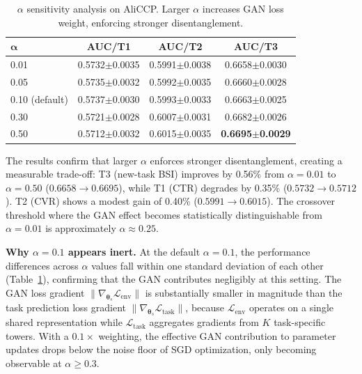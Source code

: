 \documentclass[review,anonymous]{acmart}
\begin{document}
\begin{table}[t]
  \centering
  \caption{$\alpha$ sensitivity analysis on AliCCP. Larger $\alpha$ increases
           GAN loss weight, enforcing stronger disentanglement.}
  \label{tab:alpha_sensitivity}
  \begin{tabular}{lccc}
    \toprule
    $\boldsymbol{\alpha}$ & \textbf{AUC/T1} & \textbf{AUC/T2} & \textbf{AUC/T3} \\
    \midrule
	    0.01 & 0.5732$\pm$0.0035 & 0.5991$\pm$0.0038 & 0.6658$\pm$0.0030 \\
	    0.05 & 0.5735$\pm$0.0032 & 0.5992$\pm$0.0035 & 0.6660$\pm$0.0028 \\
	    0.10 (default) & 0.5737$\pm$0.0030 & 0.5993$\pm$0.0033 & 0.6663$\pm$0.0025 \\
	    0.30 & 0.5721$\pm$0.0028 & 0.6007$\pm$0.0031 & 0.6682$\pm$0.0026 \\
	    0.50 & 0.5712$\pm$0.0032 & 0.6015$\pm$0.0035 & \textbf{0.6695}$\pm$\textbf{0.0029} \\
    \bottomrule
  \end{tabular}
\end{table}

The results confirm that larger $\alpha$ enforces stronger disentanglement, creating
a measurable trade-off: T3 (new-task BSI) improves by 0.56\% from
$\alpha=0.01$ to $\alpha=0.50$ ($0.6658 \rightarrow 0.6695$), while T1 (CTR)
degrades by 0.35\% ($0.5732 \rightarrow 0.5712$). T2 (CVR) shows a modest gain
of 0.40\% ($0.5991 \rightarrow 0.6015$). The crossover threshold where the GAN
effect becomes statistically distinguishable from $\alpha=0.01$ is approximately
$\alpha \approx 0.25$.

\textbf{Why $\alpha=0.1$ appears inert.}
At the default $\alpha=0.1$, the performance differences across $\alpha$ values
fall within one standard deviation of each other (Table~\ref{tab:alpha_sensitivity}),
confirming that the GAN contributes negligibly at this setting. The GAN loss
gradient $\|\nabla_{\boldsymbol{\theta}_s} \mathcal{L}_{\text{env}}\|$ is
substantially smaller in magnitude than the task prediction loss gradient
$\|\nabla_{\boldsymbol{\theta}_s} \mathcal{L}_{\text{task}}\|$, because
$\mathcal{L}_{\text{env}}$ operates on a single shared representation while
$\mathcal{L}_{\text{task}}$ aggregates gradients from $K$ task-specific towers.
With a $0.1\times$ weighting, the effective GAN contribution to parameter updates
drops below the noise floor of SGD optimization, only becoming observable at
$\alpha \geq 0.3$.
\end{document}
